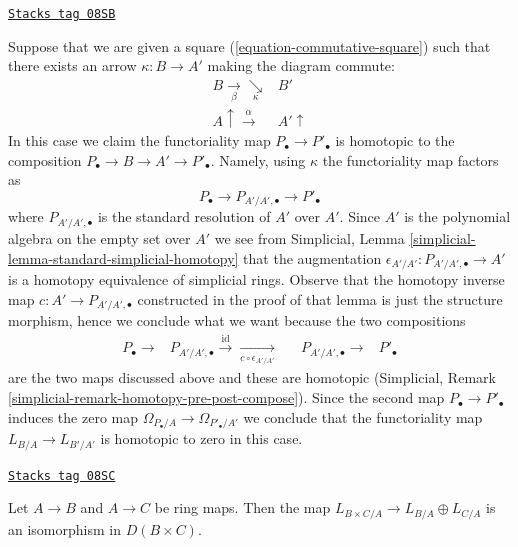 \begin{remark}
\label{cotangent-remark-homotopy-triangle}
\href{https://stacks.math.columbia.edu/tag/08SB}{\texttt{Stacks tag 08SB}}

Suppose that we are given a square (\ref{equation-commutative-square})
such that there exists an arrow $\kappa : B \to A'$ making the diagram
commute:
$$
\begin{array}{cc}B \underset{\beta}{\longrightarrow}\underset{\kappa}{\searrow} & B' \\ A \uparrow\overset{\alpha}{\longrightarrow} & A' \uparrow\end{array}
$$
In this case we claim the functoriality map $P_\bullet \to P'_\bullet$
is homotopic to the composition $P_\bullet \to B \to A' \to P'_\bullet$.
Namely, using $\kappa$ the functoriality map factors as
$$
P_\bullet \to P_{A'/A', \bullet} \to P'_\bullet
$$
where $P_{A'/A', \bullet}$ is the standard resolution of $A'$ over $A'$.
Since $A'$ is the polynomial algebra on the empty set over $A'$ we
see from Simplicial, Lemma \ref{simplicial-lemma-standard-simplicial-homotopy}
that the augmentation $\epsilon_{A'/A'} : P_{A'/A', \bullet} \to A'$
is a homotopy equivalence of simplicial rings. Observe that the homotopy
inverse map $c : A' \to P_{A'/A', \bullet}$ constructed in the proof of
that lemma is just the structure morphism, hence
we conclude what we want because the two compositions
$$
\begin{array}{ccccc}P_\bullet \longrightarrow & P_{A'/A', \bullet} \overset{\text{id}}{\longrightarrow}\underset{c \circ \epsilon_{A'/A'}}{\longrightarrow} &  & P_{A'/A', \bullet} \longrightarrow & P'_\bullet\end{array}
$$
are the two maps discussed above and these are homotopic
(Simplicial, Remark \ref{simplicial-remark-homotopy-pre-post-compose}).
Since the second map $P_\bullet \to P'_\bullet$ induces the zero
map $\Omega_{P_\bullet/A} \to \Omega_{P'_\bullet/A'}$ we conclude
that the functoriality map $L_{B/A} \to L_{B'/A'}$ is homotopic
to zero in this case.
\end{remark}

\begin{lemma}
\label{cotangent-lemma-cotangent-complex-product}
\href{https://stacks.math.columbia.edu/tag/08SC}{\texttt{Stacks tag 08SC}}

Let $A \to B$ and $A \to C$ be ring maps.
Then the map $L_{B \times C/A} \to L_{B/A} \oplus L_{C/A}$ is
an isomorphism in $D(B \times C)$.
\end{lemma}


